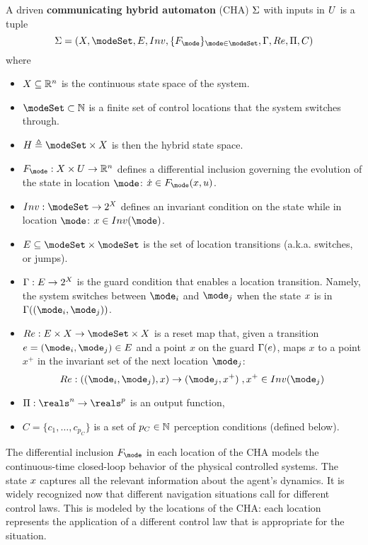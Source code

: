 \begin{defn}
	\label{def:CHA}
A driven \textbf{communicating hybrid automaton} (CHA) $\Sigma$ with inputs in $U$ 
is a tuple 
\[\Sys = (\stSet, \modeSet, E, Inv, \{F_\mode\}_{\mode \in \modeSet}, \guard, \reset, \funcOut, C)\]
where 
\begin{itemize}
	\item $X \subseteq \mathbb{R}^n$ is the continuous state space of the system.
	\item $\modeSet \subset \Ne$ is a finite set of control locations that the system switches through. 
	\item $\hsSet \triangleq \modeSet \times \stSet$ is then the hybrid state space.
	\item $F_\mode : \stSet \times \inpSet \rightarrow \Re^n$ defines a differential inclusion governing the evolution of the state in location $\mode$: $\dot{\stPt} \in F_\mode(\stPt,u)$. 
	\item $Inv : \modeSet \rightarrow 2^\stSet$ defines an invariant condition on the state while in location $\mode$: $\stPt \in Inv(\mode)$.
	\item $E \subseteq \modeSet \times \modeSet$ is the set of location transitions (a.k.a. switches, or jumps).
	\item $\Gamma : E \rightarrow 2^X$ is the guard condition that enables a location transition. 
	Namely, the system switches between $\mode _i$ and $\mode _j$ when the state $x$ is in $\guard((\mode_i,\mode _j))$.
	\item $\reset : E \times \stSet \rightarrow \modeSet \times \stSet $ is a reset map that, given a transition $e = (\mode _i,\mode _j) \in E$ and a point $x$ on the guard $\Gamma(e)$, maps $x$ to a point $x^+$ in the invariant set of the next location $\mode_j$:
	\[\reset: ((\mode _i,\mode _j),x) \rightarrow (\mode_j,x^+)\;, x^+ \in Inv(\mode_j)\] 
	\item $\funcOut: \reals^n \rightarrow \reals^p$ is an output function,
	\item $C = \{c_1,\ldots,c_{p_C}\}$ is a set of $p_C \in \mathbb{N}$ perception conditions (defined below).	
\end{itemize}
\end{defn}

The differential inclusion $F_\mode$ in each location of the CHA models the continuous-time closed-loop behavior of the physical controlled systems.%
The state $x$ captures all the relevant information about the agent's dynamics. 
It is widely recognized now that different navigation situations call for different control laws.
This is modeled by the locations of the CHA: each location represents the application of a different control law that is appropriate for the situation.

